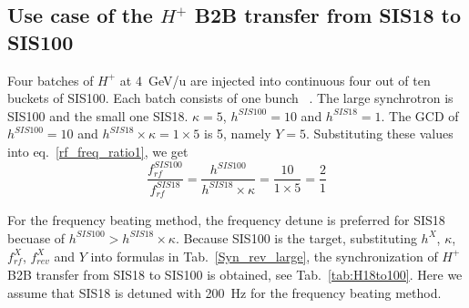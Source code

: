 %
%
\subsection{Use case of the $H^{+}$ B2B transfer from SIS18 to SIS100}
Four batches of $H^{+}$ at \SI{4}{GeV/\atomicmassunit} are injected into continuous four out of ten buckets of SIS100. Each batch consists of one bunch ~\cite{liebermann_fair_2013, liebermann_sis100_2013}. The large synchrotron is SIS100 and the small one SIS18. $\kappa=5$, $h^{\mathit{SIS100}}=10$ and $h^{\mathit{SIS18}}=1$. The GCD of $h^{\mathit{SIS100}}=10$ and $h^{\mathit{SIS18}} \times \kappa=1\times 5$ is 5, namely $Y=5$. Substituting these values into eq.~\ref{rf_freq_ratio1}, we get
\begin{equation}
\frac{f_{\mathit{rf}}^{\mathit{SIS100}}}{f_{\mathit{rf}}^{\mathit{SIS18}}}= \frac {h^{\mathit{SIS100}}}{h^{\mathit{SIS18}} \times \kappa}= \frac{10}{1 \times 5}=\frac{2}{1}
\end{equation}

For the frequency beating method, the frequency detune is preferred for SIS18 becuase of $h^{\mathit{SIS100}} > h^{\mathit{SIS18}} \times \kappa$. Because SIS100 is the target, substituting $h^X$, $\kappa$, $f_{\mathit{rf}}^{X}$, $f_{\mathit{rev}}^{X}$ and $Y$ into formulas in Tab.~\ref{Syn_rev_large}, the synchronization of $H^{+}$ B2B transfer from SIS18 to SIS100 is obtained, see Tab.~\ref{tab:H18to100}. Here we assume that SIS18 is detuned with \SI{200}{Hz} for the frequency beating method. 

